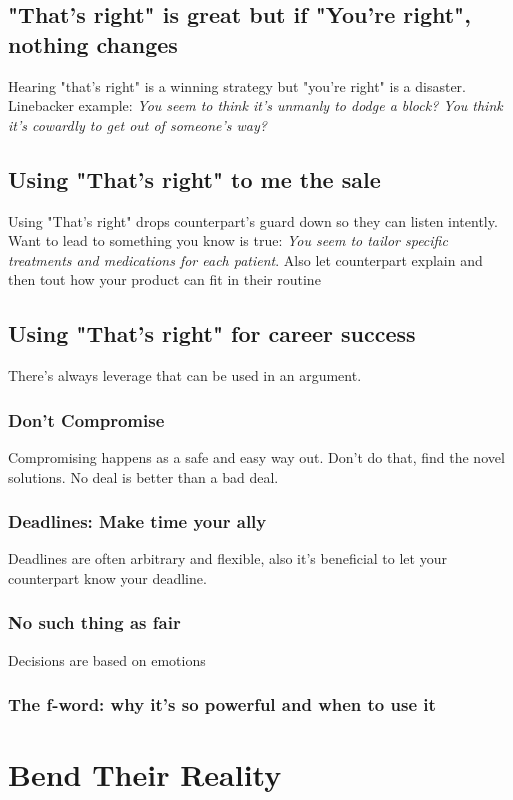 \documentclass{summary}
\begin{document}
\subsection{"That's right" is great but if "You're right", nothing changes}
Hearing "that's right" is a winning strategy but "you're right" is a disaster. Linebacker example: \textit{You seem to think it's unmanly to dodge a block? You think it's cowardly to get out of someone's way?}

\subsection{Using "That's right" to me the sale}
Using "That's right" drops counterpart's guard down so they can listen intently. Want to lead to something you know is true: \textit{You seem to tailor specific treatments and medications for each patient}. Also let counterpart explain and then tout how your product can fit in their routine

\subsection{Using "That's right" for career success}
There's always leverage that can be used in an argument.

\subsubsection{Don't Compromise}
Compromising happens as a safe and easy way out. Don't do that, find the novel solutions. No deal is better than a bad deal.

\subsubsection{Deadlines: Make time your ally}
Deadlines are often arbitrary and flexible, also it's beneficial to let your counterpart know your deadline.

\subsubsection{No such thing as fair}
Decisions are based on emotions

\subsubsection{The f-word: why it's so powerful and when to use it}


\section{Bend Their Reality}
\end{document}
